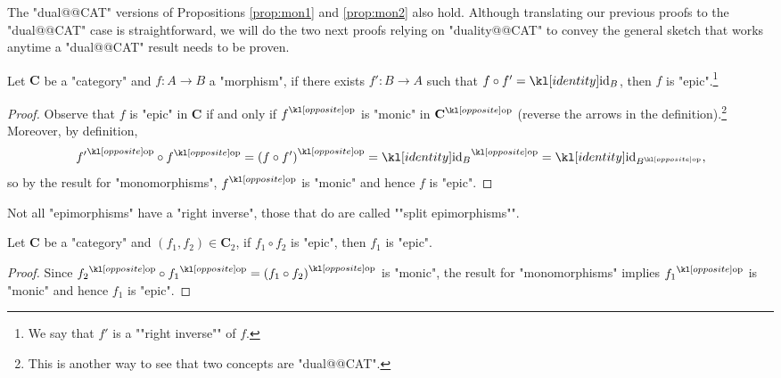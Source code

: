 \documentclass[main.tex]{subfiles}
\begin{document}
The "dual@@CAT" versions of Propositions \ref{prop:mon1} and \ref{prop:mon2} also hold. Although translating our previous proofs to the "dual@@CAT" case is straightforward, we will do the two next proofs relying on "duality@@CAT" to convey the general sketch that works anytime a "dual@@CAT" result needs to be proven.
\begin{prop}\label{prop:ep1}
	Let $\mathbf{C}$ be a "category" and $f:A\rightarrow B$ a "morphism", if there exists $f': B\rightarrow A$ such that $f\circ f' = \id_B$, then $f$ is "epic".\footnote{\AP We say that $f'$ is a ""right inverse"" of $f$.}
\end{prop}
\begin{proof}
	Observe that $f$ is "epic" in $\mathbf{C}$ if and only if $\op{f}$ is "monic" in $\op{\mathbf{C}}$ (reverse the arrows in the definition).\footnote{This is another way to see that two concepts are "dual@@CAT".} Moreover, by definition, \[\op{f'} \circ \op{f} = \op{(f \circ f')} = \op{\id_B} = \id_{\op{B}},\] so by the result for "monomorphisms", $\op{f}$ is "monic" and hence $f$ is "epic". 
\end{proof}
\AP Not all "epimorphisms" have a "right inverse", those that do are called ""split epimorphisms"".
\begin{prop}
	Let $\mathbf{C}$ be a "category" and $(f_1, f_2) \in \mathbf{C}_2$, if $f_1 \circ f_2$ is "epic", then $f_1$ is "epic".
\end{prop}
\begin{proof}
	Since $\op{f_2} \circ \op{f_1} = \op{(f_1 \circ f_2)}$ is "monic", the result for "monomorphisms" implies $\op{f_1}$ is "monic" and hence $f_1$ is "epic".
\end{proof}
\end{document}
